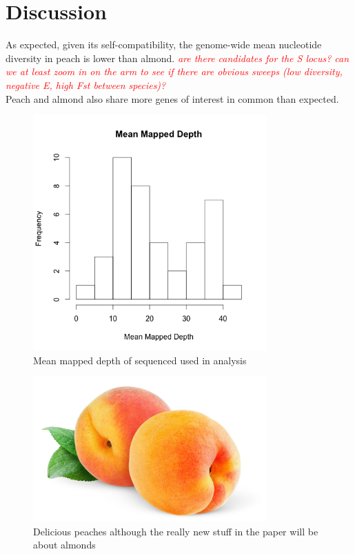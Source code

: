 \documentclass[12pt]{article}
\newcommand{\beginsupplement}{%
        \setcounter{table}{0}
        \renewcommand{\thetable}{S\arabic{table}}%
        \setcounter{figure}{0}
        \renewcommand{\thefigure}{S\arabic{figure}}%
     }
\newcommand{\jri}[1]{\textcolor{red}{ \emph{ #1}} }
\begin{document}
\section*{Discussion}
As expected, given its self-compatibility, the genome-wide mean nucleotide diversity in peach is lower than almond. \jri{are there candidates for the S locus? can we at least zoom in on the arm to see if there are obvious sweeps (low diversity, negative E, high Fst between species)?}
%
\\
Peach and almond also share more genes of interest in common than expected.
%

\pagebreak

%
%
%
\pagebreak
\begin{figure}[b]
\centering
   \includegraphics[width=0.8\textwidth]{depthBQ20MQ30.png}
  \caption{Mean mapped depth of sequenced used in analysis}
  \label{fig:depth}
\end{figure}

\begin{figure}[b]
\centering
   \includegraphics[width=0.8\textwidth]{peachzdfgad.jpg}
  \caption{Delicious peaches although the really new stuff in the paper will be about almonds}
  \label{fig:peach}
\end{figure}
%
\pagebreak
\beginsupplement
\end{document}
